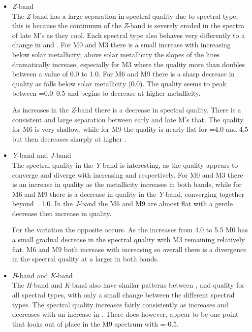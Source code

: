 \begin{itemize}
\item \emph{Z}-band\\
The \emph{Z}-band has a large separation in spectral quality due to spectral type, this is because the continuum of the \emph{Z}-band is severely eroded in the spectra of late M's as they cool.
Each spectral type also behaves very differently to a change in \feh{} and \Logg{}.
For {M0} and {M3} there is a small increase with increasing \feh{} below solar metallicity; above solar metallicity the slopes of the lines dramatically increase, especially for {M3} where the quality more than doubles between a \feh{} value of 0.0 to 1.0.
For {M6} and {M9} there is a sharp decrease in quality as \feh{} falls below solar metallicity (0.0).
The quality seems to peak between \feh{}=0.0--0.5 and begins to decrease at higher metallicity.

As \Logg{} increases in the \emph{Z}-band there is a decrease in spectral quality.
There is a consistent and large separation between early and late M's that.
The quality for {M6} is very shallow, while for {M9} the quality is nearly flat for \Logg{}=4.0 and 4.5 but then decreases sharply at higher \Logg{}.

\item \emph{Y}-band and \emph{J}-band \\
The spectral quality in the \emph{Y}-band is interesting, as the quality appears to converge and diverge with increasing \feh{} and \Logg{} respectively.
For {M0} and {M3} there is an increase in quality as the metallicity increases in both bands, while for {M6} and {M9} there is a decrease in quality in the \emph{Y}-band, converging together beyond \feh{}=1.0.
In the \emph{J}-band the {M6} and {M9} are almost flat with a gentle decrease then increase in quality.

For the \Logg{} variation the opposite occurs.
As the \Logg{} increases from 4.0 to 5.5 {M0} has a small gradual decrease in the spectral quality with {M3} remaining relatively flat.
{M6} and {M9} both increase with increasing \Logg{} so overall there is a divergence in the spectral quality at a larger \Logg{} in both bands.

\item \emph{H}-band and \emph{K}-band \\
The \emph{H}-band and \emph{K}-band also have similar patterns between \feh{}, \Logg{} and quality for all spectral types, with only a small change between the different spectral types.
The spectral quality increases fairly consistently as \feh{} increases and decreases with an increase in \Logg{}.
There does however, appear to be one point that looks out of place in the {M9} spectrum with \feh{}=-0.5.
\end{itemize}

